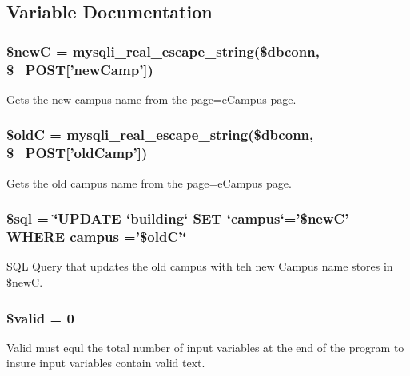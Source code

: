 \subsection{\-Variable \-Documentation}
\hypertarget{upCampus_8php_ad06b2227b1785217614a1af1253505e0}{
\subsubsection[{\$new\-C}]{\setlength{\rightskip}{0pt plus 5cm}\$new\-C = mysqli\-\_\-real\-\_\-escape\-\_\-string(\$dbconn, \$\-\_\-\-P\-O\-S\-T\mbox{[}'new\-Camp'\mbox{]})}}\label{upCampus_8php_ad06b2227b1785217614a1af1253505e0}
\-Gets the new campus name from the page=e\-Campus page. \hypertarget{upCampus_8php_a50d27d31cd853f014465997ccb9a89f0}{
\subsubsection[{\$old\-C}]{\setlength{\rightskip}{0pt plus 5cm}\$old\-C = mysqli\-\_\-real\-\_\-escape\-\_\-string(\$dbconn, \$\-\_\-\-P\-O\-S\-T\mbox{[}'old\-Camp'\mbox{]})}}\label{upCampus_8php_a50d27d31cd853f014465997ccb9a89f0}
\-Gets the old campus name from the page=e\-Campus page. \hypertarget{upCampus_8php_a047170d6020a882807665812a27e2525}{
\subsubsection[{\$sql}]{\setlength{\rightskip}{0pt plus 5cm}\$sql = \char`\"{}\-U\-P\-D\-A\-T\-E `building` \-S\-E\-T `campus`='\$new\-C' \-W\-H\-E\-R\-E campus ='\$old\-C'\char`\"{}}}\label{upCampus_8php_a047170d6020a882807665812a27e2525}
\-S\-Q\-L \-Query that updates the old campus with teh new \-Campus name stores in \$new\-C. \hypertarget{upCampus_8php_a0587674d27d00ef497e08e53ccf45bbb}{
\subsubsection[{\$valid}]{\setlength{\rightskip}{0pt plus 5cm}\$valid = 0}}\label{upCampus_8php_a0587674d27d00ef497e08e53ccf45bbb}
\-Valid must equl the total number of input variables at the end of the program to insure input variables contain valid text. 